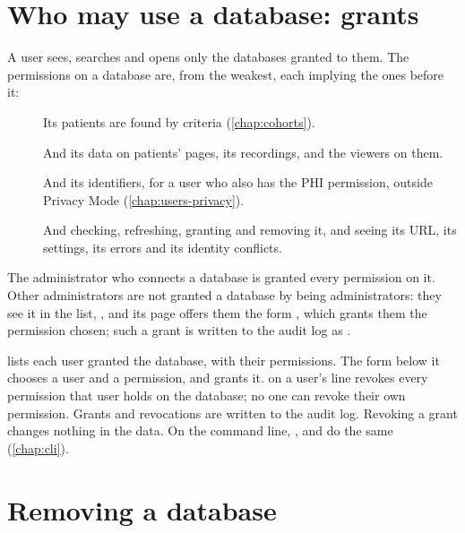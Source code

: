 \section{Who may use a database: grants}
\label{sec:databases-tab-grants}

A user sees, searches and opens only the databases granted to them. The permissions on a
database are, from the weakest, each implying the ones before it:
\begin{description}
\item[] Its patients are found by criteria (\cref{chap:cohorts}).
\item[] And its data on patients' pages, its recordings, and the viewers on them.
\item[] And its identifiers, for a user who also has the PHI permission, outside
  Privacy Mode (\cref{chap:users-privacy}).
\item[] And checking, refreshing, granting and removing it, and seeing its URL, its
  settings, its errors and its identity conflicts.
\end{description}
The administrator who connects a database is granted every permission on it. Other
administrators are not granted a database by being administrators: they see it in the list,
, and its page offers them the form , which grants them
the permission chosen; such a grant is written to the audit log as .

 lists each user granted the database, with their permissions. The form below
it chooses a user and a permission, and  grants it.  on a user's line
revokes every permission that user holds on the database; no one can revoke their own
 permission. Grants and revocations are written to the audit log. Revoking a grant
changes nothing in the data. On the command line, ,
 and  do the same (\cref{chap:cli}).

\section{Removing a database}
\label{sec:databases-tab-remove}

